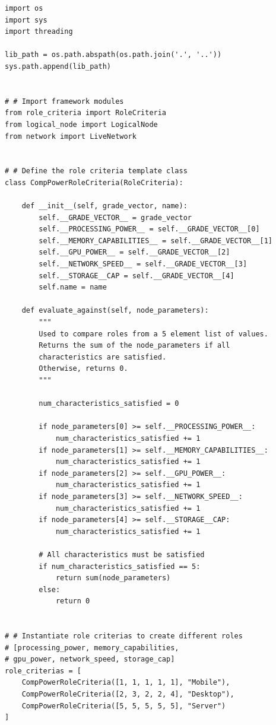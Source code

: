 \documentclass[11pt]{article}
\begin{document}
\lstset{frame=single, caption=Example Framework Listing in Python}
\begin{lstlisting}
import os
import sys
import threading

lib_path = os.path.abspath(os.path.join('.', '..'))
sys.path.append(lib_path)


# # Import framework modules
from role_criteria import RoleCriteria
from logical_node import LogicalNode
from network import LiveNetwork


# # Define the role criteria template class
class CompPowerRoleCriteria(RoleCriteria):

    def __init__(self, grade_vector, name):
        self.__GRADE_VECTOR__ = grade_vector
        self.__PROCESSING_POWER__ = self.__GRADE_VECTOR__[0]
        self.__MEMORY_CAPABILITIES__ = self.__GRADE_VECTOR__[1]
        self.__GPU_POWER__ = self.__GRADE_VECTOR__[2]
        self.__NETWORK_SPEED__ = self.__GRADE_VECTOR__[3]
        self.__STORAGE__CAP = self.__GRADE_VECTOR__[4]
        self.name = name

    def evaluate_against(self, node_parameters):
        """
        Used to compare roles from a 5 element list of values.
        Returns the sum of the node_parameters if all 
        characteristics are satisfied.
        Otherwise, returns 0.
        """

        num_characteristics_satisfied = 0

        if node_parameters[0] >= self.__PROCESSING_POWER__:
            num_characteristics_satisfied += 1
        if node_parameters[1] >= self.__MEMORY_CAPABILITIES__:
            num_characteristics_satisfied += 1
        if node_parameters[2] >= self.__GPU_POWER__:
            num_characteristics_satisfied += 1
        if node_parameters[3] >= self.__NETWORK_SPEED__:
            num_characteristics_satisfied += 1
        if node_parameters[4] >= self.__STORAGE__CAP:
            num_characteristics_satisfied += 1

        # All characteristics must be satisfied
        if num_characteristics_satisfied == 5:
            return sum(node_parameters)
        else:
            return 0


# # Instantiate role criterias to create different roles
# [processing_power, memory_capabilities, 
# gpu_power, network_speed, storage_cap]
role_criterias = [
    CompPowerRoleCriteria([1, 1, 1, 1, 1], "Mobile"),
    CompPowerRoleCriteria([2, 3, 2, 2, 4], "Desktop"),
    CompPowerRoleCriteria([5, 5, 5, 5, 5], "Server")
]



\end{lstlisting}
\end{document}
